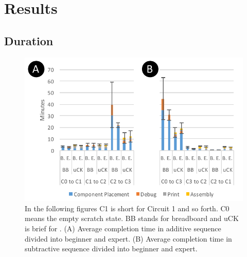\section{Results}

\subsection{Duration}


\begin{figure}
  \begin{center}
  \includegraphics[width=1\columnwidth]{figures/Circuit_Construction_Duration_v14.pdf}
  \caption{In the following figures C1 is short for Circuit 1 and so forth. C0 means the empty scratch state. BB stands for breadboard and uCK is brief for \papertitle. (A) Average completion time in additive sequence divided into beginner and expert. (B) Average completion time in subtractive sequence divided into beginner and expert.}
  \label{fig:Circuit_Construction_Duration}
  \end{center}
\end{figure}

